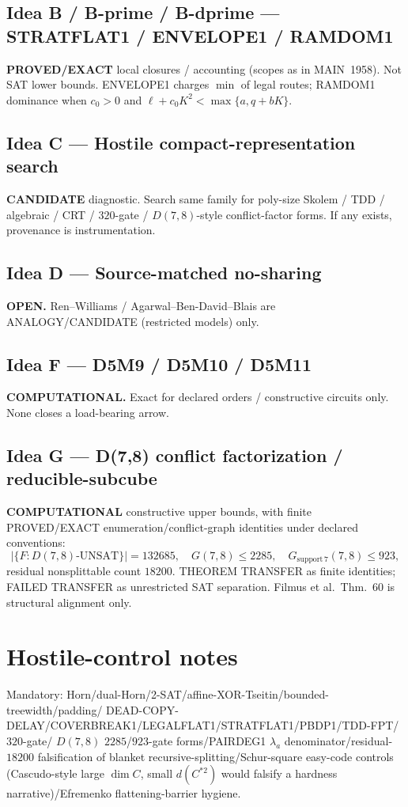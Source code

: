\documentclass[11pt]{article}
\begin{document}
\subsection*{Idea B / B-prime / B-dprime --- STRATFLAT1 / ENVELOPE1 / RAMDOM1}
\textbf{PROVED/EXACT} local closures / accounting (scopes as in MAIN~1958).
Not SAT lower bounds. ENVELOPE1 charges $\min$ of legal routes; RAMDOM1 dominance
when $c_0\gt 0$ and $\ell+c_0K^2\lt\max\{a,q+bK\}$.

\subsection*{Idea C --- Hostile compact-representation search}
\textbf{CANDIDATE} diagnostic. Search same family for poly-size Skolem / TDD /
algebraic / CRT / $320$-gate / $D(7,8)$-style conflict-factor forms. If any exists,
provenance is instrumentation.

\subsection*{Idea D --- Source-matched no-sharing}
\textbf{OPEN.} Ren--Williams / Agarwal--Ben-David--Blais are ANALOGY/CANDIDATE
(restricted models) only.

\subsection*{Idea F --- D5M9 / D5M10 / D5M11}
\textbf{COMPUTATIONAL.} Exact for declared orders / constructive circuits only.
None closes a load-bearing arrow.

\subsection*{Idea G --- D(7,8) conflict factorization / reducible-subcube}
\textbf{COMPUTATIONAL} constructive upper bounds, with finite PROVED/EXACT
enumeration/conflict-graph identities under declared conventions:
\[
|\{F:D(7,8)\text{-UNSAT}\}|=132685,\quad
G(7,8)\le 2285,\quad
G_{\mathrm{support}\,7}(7,8)\le 923,
\]
residual nonsplittable count $18200$. THEOREM TRANSFER as finite identities;
FAILED TRANSFER as unrestricted SAT separation. Filmus et al.\ Thm.~60 is
structural alignment only.

\section*{Hostile-control notes}
Mandatory: Horn/dual-Horn/2-SAT/affine-XOR-Tseitin/bounded-treewidth/padding/
DEAD-COPY-DELAY/COVERBREAK1/LEGALFLAT1/STRATFLAT1/PBDP1/TDD-FPT/$320$-gate/
$D(7,8)$ $2285$/$923$-gate forms/PAIRDEG1 $\lambda_a$ denominator/residual-$18200$
falsification of blanket recursive-splitting/Schur-square easy-code controls
(Cascudo-style large $\dim C$, small $d(C^{*2})$ would falsify a hardness
narrative)/Efremenko flattening-barrier hygiene.
\end{document}
